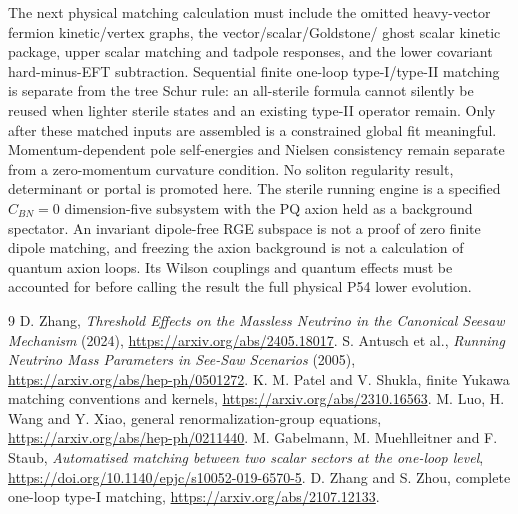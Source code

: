 \documentclass[11pt]{article}
\begin{document}
The next physical matching calculation must include the omitted
heavy-vector fermion kinetic/vertex graphs, the vector/scalar/Goldstone/
ghost scalar kinetic package, upper scalar matching and tadpole
responses, and the lower covariant hard-minus-EFT subtraction.
Sequential finite one-loop type-I/type-II matching is separate from
the tree Schur rule: an all-sterile formula cannot silently be reused
when lighter sterile states and an existing type-II operator remain.
Only after these matched inputs are assembled is a constrained global
fit meaningful. Momentum-dependent pole self-energies and Nielsen
consistency remain separate from a zero-momentum curvature condition.
No soliton regularity result, determinant or portal is promoted here.
The sterile running engine is a specified $C_{BN}=0$ dimension-five
subsystem with the PQ axion held as a background spectator. An invariant
dipole-free RGE subspace is not a proof of zero finite dipole matching,
and freezing the axion background is not a calculation of quantum axion
loops. Its Wilson couplings and quantum effects must be accounted for
before calling the result the full physical P54 lower evolution.

\begin{thebibliography}{9}
 D. Zhang, \emph{Threshold Effects on the Massless
Neutrino in the Canonical Seesaw Mechanism} (2024),
\url{https://arxiv.org/abs/2405.18017}.
 S. Antusch et al., \emph{Running Neutrino Mass
Parameters in See-Saw Scenarios} (2005),
\url{https://arxiv.org/abs/hep-ph/0501272}.
 K. M. Patel and V. Shukla, finite Yukawa matching
conventions and kernels, \url{https://arxiv.org/abs/2310.16563}.
 M. Luo, H. Wang and Y. Xiao, general renormalization-group
equations, \url{https://arxiv.org/abs/hep-ph/0211440}.
 M. Gabelmann, M. Muehlleitner and F. Staub,
\emph{Automatised matching between two scalar sectors at the one-loop level},
\url{https://doi.org/10.1140/epjc/s10052-019-6570-5}.
 D. Zhang and S. Zhou, complete one-loop type-I matching,
\url{https://arxiv.org/abs/2107.12133}.
\end{thebibliography}
\end{document}
